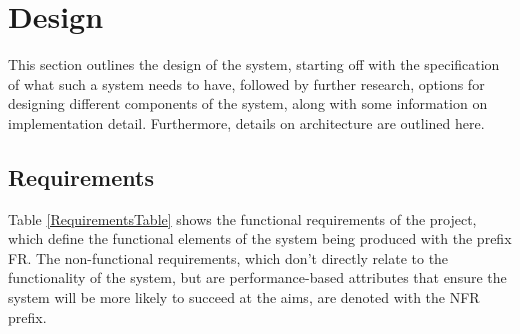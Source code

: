 \documentclass[12pt,a4paper]{article}
\begin{document}

\section{Design}

This section outlines the design of the system, starting off with the specification of what such a system needs to have, followed by further research, options for designing different components of the system, along with some information on implementation detail. Furthermore, details on architecture are outlined here.

\subsection{Requirements}
Table \ref{RequirementsTable} shows the functional requirements of the project, which define the functional elements of the system being produced with the prefix FR.
The non-functional requirements, which don't directly relate to the functionality of the system, but are performance-based attributes
that ensure the system will be more likely to succeed at the aims, are denoted with the NFR prefix.
\end{document}
